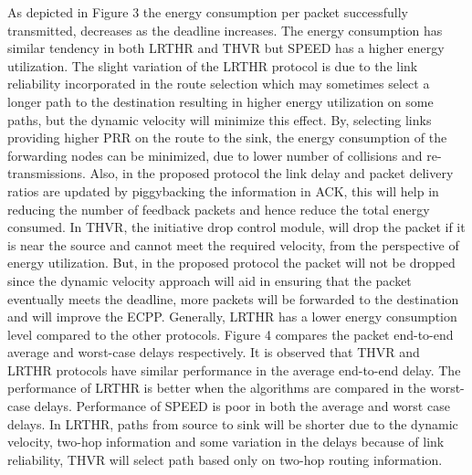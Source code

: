 \documentclass[fleqn,twoside]{article}
\begin{document}
As depicted in Figure 3 the energy consumption per packet successfully transmitted, decreases as the deadline increases. The energy consumption has similar tendency in both LRTHR and THVR but SPEED has a higher energy utilization. The slight variation
of the LRTHR protocol is due to the link reliability incorporated in the route selection which may sometimes select a longer path 
to the destination resulting in higher energy utilization on some paths, but the dynamic velocity will minimize this effect. 
By, selecting links providing higher PRR on the route to the sink, the energy consumption of the forwarding nodes can be 
minimized, due to lower number of collisions and re-transmissions. Also, in the proposed protocol the link delay and 
packet delivery ratios are updated by piggybacking the information in ACK, this will help in reducing the number of feedback
packets and hence reduce the total energy consumed.
\vskip 2mm
In THVR, the initiative drop control module, will drop the packet if it is near the source and cannot meet the required 
velocity, from the perspective of energy utilization. But, in the proposed protocol the packet will not be dropped since the dynamic velocity approach will aid in ensuring that the packet eventually meets the deadline, more packets will be forwarded to the destination and will improve the ECPP. Generally, LRTHR has a lower energy consumption level compared to the other protocols.
\vskip 2mm
Figure 4 compares the packet end-to-end average and worst-case delays respectively. It is observed that THVR and LRTHR protocols have
similar performance in the average end-to-end delay. The performance of LRTHR is better when the algorithms are compared in the worst-case delays. Performance of SPEED is poor in both the average and worst case delays. In LRTHR, paths from source to sink will be shorter due to the dynamic velocity, two-hop information and some variation in the delays because of link reliability, THVR will select path based only on two-hop routing information.
\end{document}
